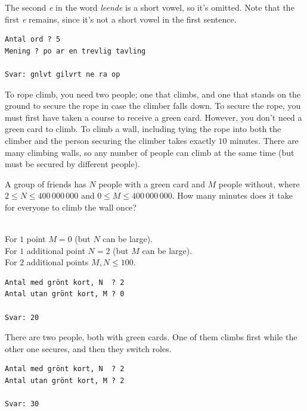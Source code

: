  The second \emph{e} in the word \emph{leende} is a short vowel, so it's omitted. Note that the first \emph{e} remains, since it's not a short vowel in the first sentence.

\vspace{1cm}

\begin{verbatim}
Antal ord ? 5
Mening ? po ar en trevlig tavling

Svar: gnlvt gilvrt ne ra op
\end{verbatim}


\newpage
{}

To rope climb, you need two people; one that climbs, and one that stands on the ground to secure the rope in case the climber falls down.
To secure the rope, you must first have taken a course to receive a green card.
However, you don't need a green card to climb.
To climb a wall, including tying the rope into both the climber and the person securing the climber takes exactly $10$ minutes.
There are many climbing walls, so any number of people can climb at the same time (but must be secured by different people).

A group of friends has $N$ people with a green card and $M$ people without, where $2 \le N \le 400\,000\,000$ and $0 \le M \le 400\,000\,000$.
How many minutes does it take for everyone to climb the wall once?

\\
For $1$ point $M = 0$ (but $N$ can be large).\\
For $1$ additional point $N = 2$ (but $M$ can be large).\\
For $2$ additional points $M,N \le 100$.


\vspace{0.5cm}

\begin{verbatim}
Antal med grönt kort, N  ? 2
Antal utan grönt kort, M ? 0

Svar: 20
\end{verbatim}

 There are two people, both with green cards.
One of them climbs first while the other one secures, and then they switch roles.

\vspace{0.5cm}

\begin{verbatim}
Antal med grönt kort, N  ? 2
Antal utan grönt kort, M ? 2

Svar: 30
\end{verbatim}


